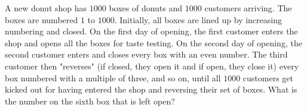 A new donut shop has $1000$ boxes of donuts and $1000$ customers arriving. The boxes are numbered $1$ to $1000$. Initially, all boxes are lined up by increasing numbering and closed. On the first day of opening, the first customer enters the shop and opens all the boxes for taste testing. On the second day of opening, the second customer enters and closes every box with an even number. The third customer then "reverses" (if closed, they open it and if open, they close it) every box numbered with a multiple of three, and so on, until all $1000$ customers get kicked out for having entered the shop and reversing their set of boxes. What is the number on the sixth box that is left open?
